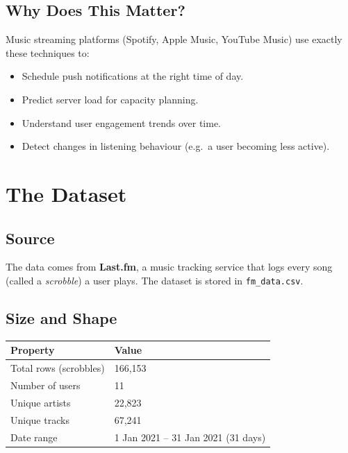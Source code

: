 \documentclass[12pt, a4paper]{article}
\begin{document}
\subsection{Why Does This Matter?}
Music streaming platforms (Spotify, Apple Music, YouTube Music) use exactly
these techniques to:
\begin{itemize}
    \item Schedule push notifications at the right time of day.
    \item Predict server load for capacity planning.
    \item Understand user engagement trends over time.
    \item Detect changes in listening behaviour (e.g.\ a user becoming less
          active).
\end{itemize}

\section{The Dataset}

\subsection{Source}
The data comes from \textbf{Last.fm}, a music tracking service that logs
every song (called a \emph{scrobble}) a user plays. The dataset is stored in
\texttt{fm\_data.csv}.

\subsection{Size and Shape}
\begin{center}
\begin{tabular}{ll}
    \toprule
    \textbf{Property} & \textbf{Value} \\
    \midrule
    Total rows (scrobbles)   & 166{,}153  \\
    Number of users          & 11         \\
    Unique artists           & 22{,}823   \\
    Unique tracks            & 67{,}241   \\
    Date range               & 1 Jan 2021 -- 31 Jan 2021 (31 days) \\
    \bottomrule
\end{tabular}
\end{center}
\end{document}

